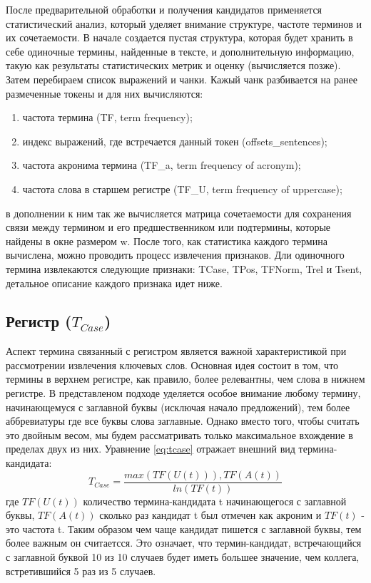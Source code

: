После предварительной обработки и получения кандидатов применяется статистический анализ, который уделяет внимание структуре, частоте терминов и их сочетаемости.
В начале создается пустая структура, которая будет хранить в себе одиночные термины, найденные в тексте, и дополнительную информацию, такую как результаты статистических метрик и оценку (вычисляется позже).
Затем перебираем список выражений и чанки.
Кажый чанк разбивается на ранее размеченные токены и для них вычисляются:
\begin{enumerate}
	\item частота термина (TF, term frequency);
	\item индекс выражений, где встречается данный токен (offsets\_sentences);
	\item частота акронима термина (TF\_a, term frequency of acronym);
	\item частота слова в старшем регистре (TF\_U, term frequency of uppercase);
\end{enumerate}
в дополнении к ним так же вычисляется матрица сочетаемости для сохранения связи между термином и его предшественником или подтермины, которые найдены в окне размером w.
После того, как статистика каждого термина вычислена, можно проводить процесс извлечения признаков.
Дли одиночного термина извлекаются следующие признаки: TCase, TPos, TFNorm, Trel и Tsent, детальное описание каждого признака идет ниже.

\subsection{Регистр ($T_{Case}$)}

Аспект термина связанный с регистром является важной характеристикой при рассмотрении извлечения ключевых слов.
Основная идея состоит в том, что термины в верхнем регистре, как правило, более релевантны, чем слова в нижнем регистре. 
В представленом подходе уделяется особое внимание любому термину, начинающемуся с заглавной буквы (исключая начало предложений), тем более аббревиатуры где все буквы слова заглавные.
Однако вместо того, чтобы считать это двойным весом, мы будем рассматривать только максимальное вхождение в пределах двух из них. 
Уравнение \eqref{eq:tcase} отражает внешний вид термина-кандидата:
\begin{equation}
	\label{eq:tcase}
	T_{Case} = \frac{max(TF(U(t))), TF(A(t))}{ln(TF(t))}
\end{equation}
где $TF(U(t))$ количество термина-кандидата t начинающегося с заглавной буквы, $TF(A(t))$ сколько раз кандидат t был отмечен как акроним и $TF(t)$ - это частота t.
Таким образом чем чаще кандидат пишется с заглавной буквы, тем более важным он считаетсся.
Это означает, что термин-кандидат, встречающийся с заглавной буквой 10 из 10 случаев будет иметь большее значение, чем коллега, встретившийся 5 раз из 5 случаев.

